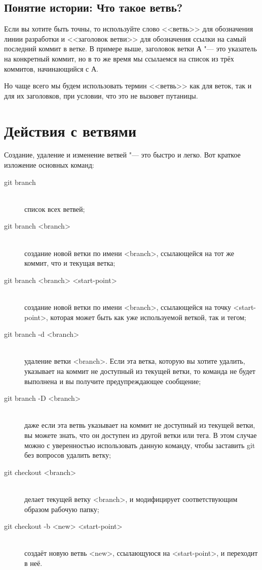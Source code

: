 \documentclass[a4paper, 12pt]{report}
\begin{document}
\subsection{Понятие истории: Что такое ветвь?}

Если вы хотите быть точны, то используйте слово <<ветвь>> для обозначения линии
разработки и <<заголовок ветви>> для обозначения ссылки на самый последний коммит
в ветке. В примере выше, заголовок ветки А "--- это указатель на конкретный коммит,
но в то же время мы ссылаемся на список из трёх коммитов, начинающийся с А.

Но чаще всего мы будем использовать термин <<ветвь>> как для веток, так и для
их заголовков, при условии, что это не вызовет путаницы.


\section{Действия с ветвями}


Создание, удаление и изменение ветвей "--- это быстро и легко. Вот краткое изложение
основных команд:

\begin{description}

\item[git branch] \ \\
список всех ветвей;

\item[git branch <branch>] \ \\
создание новой ветки по имени <branch>, ссылающейся на тот же коммит, 
что и текущая ветка;

\item[git branch <branch> <start-point>] \ \\
создание новой ветки по имени <branch>, ссылающейся на точку <start-point>,
которая может быть как уже используемой веткой, так и тегом;

\item[git branch -d <branch>] \ \\
удаление ветки <branch>. Если эта ветка, которую вы хотите удалить, 
указывает на коммит не доступный из текущей ветки, то команда не будет выполнена
и вы получите предупреждающее сообщение;

\item[git branch -D <branch>] \ \\
даже если эта ветвь указывает на коммит не доступный из текущей ветки, вы можете
знать, что он доступен из другой ветки или тега. В этом случае можно с уверенностью
использовать данную команду, чтобы заставить git без вопросов удалить ветку;

\item[git checkout <branch>] \ \\
делает текущей ветку <branch>, и модифицирует соответствующим образом рабочую
папку;

\item[git checkout -b <new> <start-point>] \ \\
создаёт новую ветвь <new>, ссылающуюся на <start-point>, и переходит в неё.

\end{description}
\end{document}
